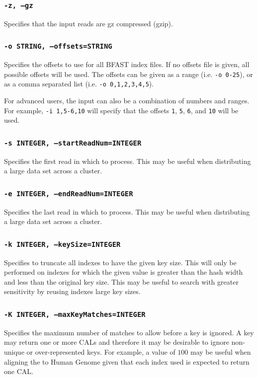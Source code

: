 \documentclass[a4paper,12pt]{book}
\newcommand{\TT}[1]{{\tt #1}} %
\newcommand{\BIF}{BFAST index file} %
\begin{document}
\subsubsection{\TT{-z, --gz}}
Specifies that the input reads are gz compressed (gzip).
\subsubsection{\TT{-o STRING, --offsets=STRING}}
Specifies the offsets to use for all \BIF{s}.
If no offsets file is given, all possible offsets will be used.
The offsets can be given as a range (i.e. \TT{-o 0-25}), or as a comma separated list (i.e. \TT{-o 0,1,2,3,4,5}).

For advanced users, the input can also be a combination of numbers and ranges.
For example, \TT{-i 1,5-6,10} will specify that the offsets \TT{1}, \TT{5}, \TT{6}, and \TT{10} will be used.
\subsubsection{\TT{-s INTEGER, --startReadNum=INTEGER}}
Specifies the first read in which to process.
This may be useful when distributing a large data set across a cluster.

\subsubsection{\TT{-e INTEGER, --endReadNum=INTEGER}}
Specifies the last read in which to process.
This may be useful when distributing a large data set across a cluster.

\subsubsection{\TT{-k INTEGER, --keySize=INTEGER}}
Specifies to truncate all indexes to have the given key size.
This will only be performed on indexes for which the given value is greater than the hash width and less than the original key size.
This may be useful to search with greater sensitivity by reusing indexes large key sizes.

\subsubsection{\TT{-K INTEGER, --maxKeyMatches=INTEGER}}
Specifies the maximum number of matches to allow before a key is ignored.  
A key may return one or more CALs and therefore it may be desirable to ignore non-unique or over-represented keys.
For example, a value of $100$ may be useful when aligning the to Human Genome given that each index used is expected to return one CAL.
\end{document}
